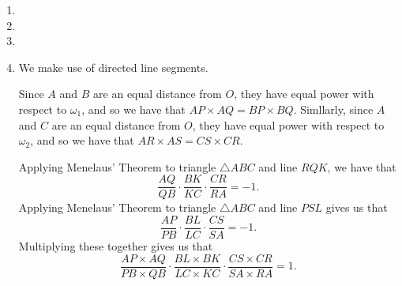 \documentclass[12pt]{article}
\begin{document}
\begin{enumerate}
\item %


\item %


\item %


\item %
We make use of directed line segments.

Since $A$ and $B$ are an equal distance from $O$, they have equal power with
respect to $\omega_1$, and so we have that $AP \times AQ = BP \times BQ$.
Simllarly, since $A$ and $C$ are an equal distance from $O$, they have equal
power with respect to $\omega_2$, and so we have that $AR \times AS = CS \times
CR$.

Applying Menelaus' Theorem to triangle $\triangle ABC$ and line $RQK$, we have
that
\[
    \frac{AQ}{QB} \cdot \frac{BK}{KC} \cdot \frac{CR}{RA} = -1.
\]
Applying Menelaus' Theorem to triangle $\triangle ABC$ and line $PSL$ gives us
that
\[
    \frac{AP}{PB} \cdot \frac{BL}{LC} \cdot \frac{CS}{SA} = -1.
\]
Multiplying these together gives us that
\[
    \frac{AP \times AQ}{PB \times QB} \cdot \frac{BL \times BK}{LC \times KC}
    \cdot \frac{CS \times CR}{SA \times RA} = 1.
\]


\end{enumerate}
\end{document}

